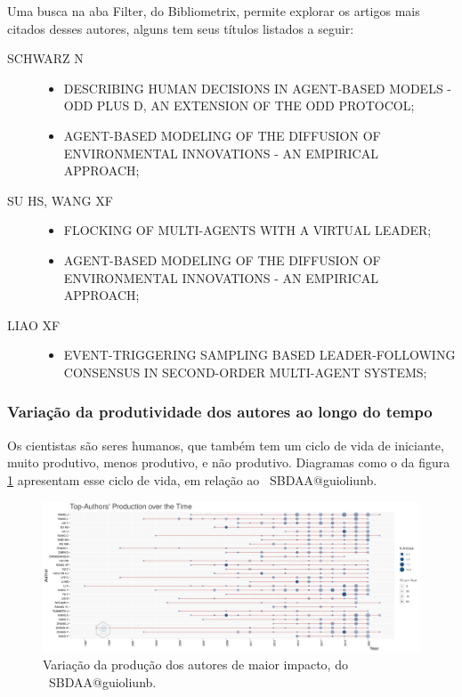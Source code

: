 Uma busca na aba Filter, do Bibliometrix, permite explorar os artigos mais citados desses autores, alguns tem seus títulos listados a seguir:
\begin{description}
    \item [SCHWARZ N] 
    \begin{itemize}
        \item DESCRIBING HUMAN DECISIONS IN AGENT-BASED MODELS - ODD PLUS D, AN EXTENSION OF THE ODD PROTOCOL;
        \item AGENT-BASED MODELING OF THE DIFFUSION OF ENVIRONMENTAL INNOVATIONS - AN EMPIRICAL APPROACH;
    \end{itemize}
    \item [SU HS, WANG XF] 
    \begin{itemize}
        \item FLOCKING OF MULTI-AGENTS WITH A VIRTUAL LEADER;
        \item AGENT-BASED MODELING OF THE DIFFUSION OF ENVIRONMENTAL INNOVATIONS - AN EMPIRICAL APPROACH;
    \end{itemize}
    \item [LIAO XF] 
    \begin{itemize}
        \item EVENT-TRIGGERING SAMPLING BASED LEADER-FOLLOWING CONSENSUS IN SECOND-ORDER MULTI-AGENT SYSTEMS;
    \end{itemize}    
\end{description}

\subsubsection{Variação da produtividade dos autores ao longo do tempo}

Os cientistas são seres humanos, que também tem um ciclo de vida de iniciante, muito produtivo, menos produtivo, e não produtivo.
Diagramas como o da figura \ref{fig:MASSA2-TopAuthorsProductionOverTime} apresentam esse ciclo de vida, em relação ao \dataset\ SBDAA@guioliunb.

\begin{figure}
    \centering
    \includegraphics[angle=90,width=1\textwidth,height=0.93\textheight]{experiments/jhcf/PesqBibliogr/SimulacaoMultiagente/WoS-20220203/Metricas/Authors/MASSA2-TopAuthorsProductionOverTime.png}
    \caption{Variação da produção dos autores de maior impacto, do \dataset\ SBDAA@guioliunb.}
    \label{fig:MASSA2-TopAuthorsProductionOverTime}
\end{figure}

